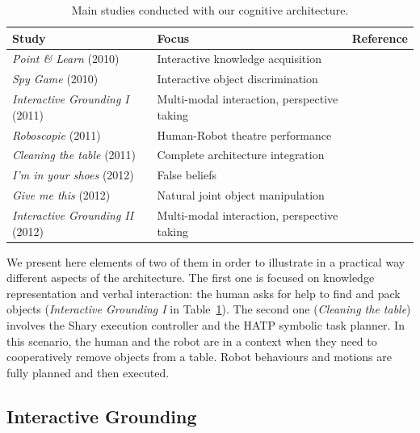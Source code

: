 \documentclass[preprint,3p,times]{elsarticle}
\begin{document}
\begin{table}
\begin{center}

\begin{tabular}{lll}
 \bf{Study} & Focus & Reference \\
\hline
{\it Point \& Learn} (2010) & Interactive knowledge acquisition & \cite{Lemaignan2010} \\
{\it Spy Game} (2010) & Interactive object discrimination & \cite{Ros2010b} \\
{\it Interactive Grounding I} (2011) & Multi-modal interaction, perspective taking & \cite{lemaignan2011what} \\
{\it Roboscopie} (2011) & Human-Robot theatre performance & \cite{lemaignan2012roboscopie} \\
{\it Cleaning the table} (2011) & Complete architecture integration & \cite{Alami2011} \\
{\it I'm in your shoes} (2012) & False beliefs & \cite{warnier2012when} \\
{\it Give me this} (2012) & Natural joint object manipulation & \cite{gharbi2013natural} \\
{\it Interactive Grounding II} (2012) & Multi-modal interaction, perspective taking & \cite{lemaignan2013talking} \\
\hline

\end{tabular}
\end{center}
\caption{Main studies conducted with our cognitive architecture.}
\label{table|experiments}
\end{table}

We present here elements of two of them in order to illustrate in a practical way
different aspects of the architecture.  The first one is focused on knowledge
representation and verbal interaction: the human asks for help to find and pack
objects ({\it Interactive Grounding I} in Table~\ref{table|experiments}). The
second one ({\it Cleaning the table}) involves the {\sc Shary} execution
controller and the HATP symbolic task planner. In this scenario, the human and
the robot are in a context when they need to cooperatively remove objects from a table. Robot behaviours and
motions are fully planned and then executed.

\subsection{Interactive Grounding}
\label{moving-london}
\end{document}
